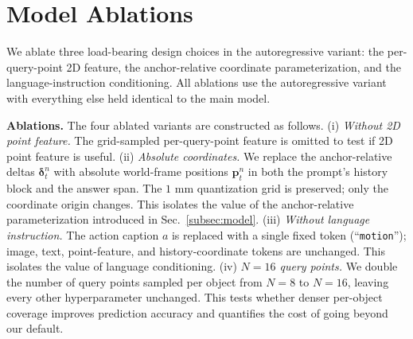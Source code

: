 \section{Model Ablations}
\label{appsec:ablations}

We ablate three load-bearing design choices in the autoregressive
variant: the per-query-point 2D feature, the anchor-relative coordinate
parameterization, and the language-instruction conditioning.
All ablations use the autoregressive variant with everything else held
identical to the main model.

\noindent\textbf{Ablations.}
The four ablated variants are constructed as follows.
(i) \textit{Without 2D point feature.} The grid-sampled per-query-point feature
is omitted to test if 2D point feature is useful.
(ii) \textit{Absolute coordinates.} We replace the anchor-relative deltas
$\boldsymbol{\delta}_t^n$ with absolute world-frame positions $\mathbf{p}_t^n$
in both the prompt's history block and the answer span. The $1$ mm
quantization grid is preserved; only the coordinate origin changes. This
isolates the value of the anchor-relative parameterization introduced in
Sec.~\ref{subsec:model}.
(iii) \textit{Without language instruction.} The action caption $a$ is
replaced with a single fixed token (``\texttt{motion}''); image, text,
point-feature, and history-coordinate tokens are unchanged. This isolates the
value of language conditioning.
(iv) \textit{$N=16$ query points.} We double the number of query points sampled
per object from $N=8$ to $N=16$, leaving every other hyperparameter unchanged.
This tests whether denser per-object coverage improves prediction accuracy and
quantifies the cost of going beyond our default.


